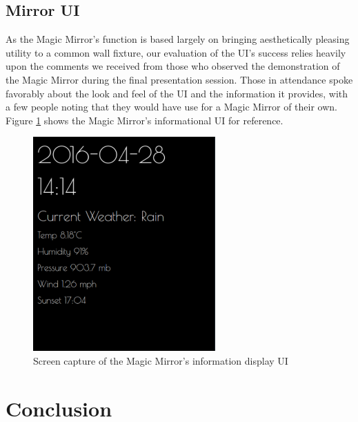 \documentclass[conference]{IEEEtran}
\begin{document}
\subsection{Mirror UI}
As the Magic Mirror's function is based largely on bringing aesthetically pleasing utility to a common wall fixture, our evaluation of the UI's success relies heavily upon the comments we received from those who observed the demonstration of the Magic Mirror during the final presentation session.
Those in attendance spoke favorably about the look and feel of the UI and the information it provides, with a few people noting that they would have use for a Magic Mirror of their own.
Figure \ref{fig:mirrorui} shows the Magic Mirror's informational UI for reference.
\begin{figure}[!ht]
  \centering
  \includegraphics[width=2.75in]{images/mirror-ss.png}
  \caption{Screen capture of the Magic Mirror's information display UI}
  \label{fig:mirrorui}
\end{figure}


\section{Conclusion}



\end{document}
